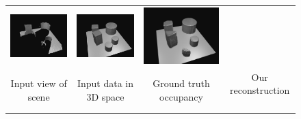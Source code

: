 \begin{figure}
\begin{tabular}{cccc}
\includegraphics[height=\turnheight]{kmrkmma8u2456lgk_SEQ_visible.png} &
\includegraphics[height=\turnheight]{kmrkmma8u2456lgk_SEQ_gt.png} &
\includegraphics[height=\turnheight]{kmrkmma8u2456lgk_SEQ_pred_voxlets.png} \\
\footnotesize Input view of scene &
\footnotesize Input data in 3D space &
\footnotesize Ground truth occupancy &
\footnotesize Our reconstruction \
\end{tabular}
\end{figure}
